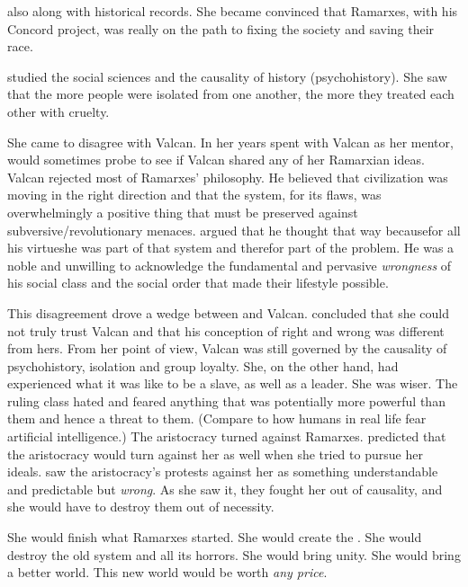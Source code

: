 \Tiamat also  along with historical records. 
She became convinced that Ramarxes, with his Concord project, was really on the path to fixing the \caisith society and saving their race. 

\Tiamat studied the social sciences and the causality of history (psychohistory). 
She saw that the more people were isolated from one another, the more they treated each other with cruelty. 

She came to disagree with Valcan. 
In her years spent with Valcan as her mentor, \Tiamat would sometimes probe to see if Valcan shared any of her Ramarxian ideas. 
Valcan rejected most of Ramarxes' philosophy. 
He believed that \caisith civilization was moving in the right direction and that the system, for its flaws, was overwhelmingly a positive thing that must be preserved against subversive/revolutionary menaces. 
\Tiamat argued that he thought that way because\dash for all his virtues\dash he was part of that system and therefor part of the problem.
He was a noble and unwilling to acknowledge the fundamental and pervasive \emph{wrongness} of his social class and the social order that made their lifestyle possible. 

This disagreement drove a wedge between \Tiamat and Valcan. 
\Tiamat concluded that she could not truly trust Valcan and that his conception of right and wrong was different from hers. 
From her point of view, Valcan was still governed by the causality of psychohistory, isolation and group loyalty. 
She, on the other hand, had experienced what it was like to be a slave, as well as a leader. 
She was wiser.
The ruling class hated and feared anything that was potentially more powerful than them and hence a threat to them. 
(Compare to how humans in real life fear artificial intelligence.) 
The aristocracy turned against Ramarxes.
\Tiamat predicted that the aristocracy would turn against her as well when she tried to pursue her ideals. 
\Tiamat saw the aristocracy's protests against her as something understandable and predictable but \emph{wrong}. 
As she saw it, they fought her out of causality, and she would have to destroy them out of necessity. 

She would finish what Ramarxes started. 
She would create the . 
She would destroy the old system and all its horrors. 
She would bring unity.
She would bring a better world. 
This new world would be worth \emph{any price}. 






